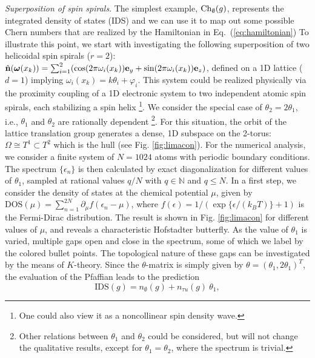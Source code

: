 \documentclass[
    10pt,
    aps,
    prr,
    twocolumn,
    floatfix,
    superscriptaddress
]{revtex4-2}
\newcommand{\revise}[1]{{\color{red} #1}}
\begin{document}
\revise{{\it Superposition of spin spirals}}. The simplest example, ${\rm Ch}_{\emptyset} (g)$, represents the integrated density of states (IDS) and we can use it to map out some possible Chern numbers that are realized by the Hamiltonian in Eq.~(\ref{eq:hamiltonian})
To illustrate this point, we start with investigating the following superposition of two helicoidal spin spirals ($r=2$):
$\hat{\mathbf{n}}( \boldsymbol{\omega}(x_k ) )
=\sum_{i=1}^{2}( \cos ( 2 \pi \omega_i(x_k) )\mathbf{e}_y
+\sin ( 2 \pi \omega_i(x_k) )\mathbf{e}_z)
$,
defined on a 1D lattice ($d=1$) implying $\omega_i(x_k) = k \theta_i + \varphi_i$. 
This system could be realized physically via the proximity coupling of a 1D electronic system to two independent atomic spin spirals, each stabilizing a spin helix \footnote{One could also view it as a noncollinear spin density wave.}.
We consider the special case of $\theta_2 = 2 \theta_1$, i.e., $\theta_1$ and $\theta_2$ are rationally dependent \footnote{Other relations between $\theta_1$ and $\theta_2$ could be considered, but will not change the qualitative results, except for $\theta_1=\theta_2$, where the spectrum is trivial.}.
For this situation, the orbit of the lattice translation group generates a dense, 1D subspace on the 2-torus:  $\Omega \cong T^1 \subset T^2$ which is the hull (see Fig. \ref{fig:limacon}).
For the numerical analysis, we consider a finite system of $N=1024$ atoms with periodic boundary conditions. 
The spectrum $\lbrace \epsilon_n \rbrace$ is then calculated by exact diagonalization for different values of $\theta_1$, sampled at rational values $q/N$ with $q\in \mathbb{N}$ and $q \leq N$.
In a first step, we consider the density of states at the chemical potential $\mu$, given by
$\mathrm{DOS}(\mu) = \sum_{n=1}^{2N} \partial_\mu f( \epsilon_n - \mu)$, where $f(\epsilon) = 1/ ( \exp\lbrace \epsilon / (k_B T) \rbrace + 1 ) $ is the Fermi-Dirac distribution.
The result is shown in Fig. \ref{fig:limacon} for different values of $\mu$, and reveals a characteristic Hofstadter butterfly.
As the value of $\theta_1$ is varied, multiple gaps open and close in the spectrum, some of which we label by the colored bullet points.
The topological nature of these gaps can be investigated by the means of $K$-theory.
Since the $\theta$-matrix is simply given by $\theta = (\theta_1, 2\theta_1)^T$, the evaluation of the Pfaffian leads to the prediction
\begin{equation}
    \mathrm{IDS}(g) = n_\emptyset(g) + n_{\tau u}(g)~\theta_1 ,
    \label{eq:k_prediction}
\end{equation}
\end{document}
